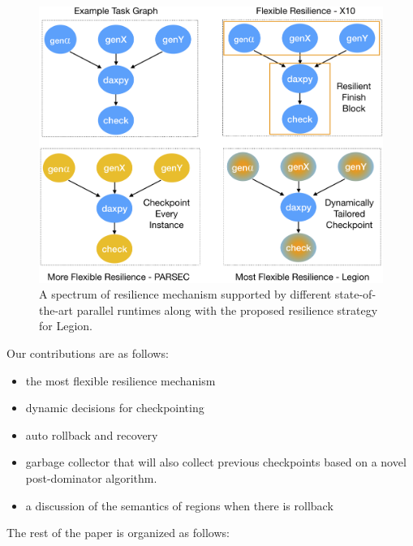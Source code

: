 \begin{figure}
\includegraphics[width=.40\textwidth]{images/spectrum_x10_parsec_legion_policies.png}
\caption{A spectrum of resilience mechanism supported by different
state-of-the-art parallel runtimes along with the proposed resilience strategy
for Legion.} 
\end{figure}

Our contributions are as follows: 
\begin{itemize} 
\item the most flexible resilience mechanism 
\item dynamic decisions for checkpointing 
\item auto rollback and recovery 
\item garbage collector that will also collect previous 
checkpoints based on a novel post-dominator algorithm.  
\item a discussion of the semantics of regions when there is rollback 
\end{itemize}

The rest of the paper is organized as follows:

%
%
%
%
%
